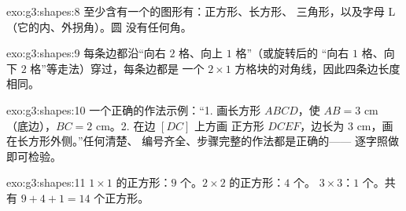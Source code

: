 \begin{solution}{exo:g3:shapes:8}
至少含有一个的图形有：正方形、长方形、
三角形，以及字母 L（它的内、外拐角）。圆
没有任何角。
\end{solution}

\begin{solution}{exo:g3:shapes:9}
每条边都沿“向右 $2$ 格、向上 $1$ 格”（或旋转后的
“向右 $1$ 格、向下 $2$ 格”等走法）穿过，每条边都是
一个 $2 \times 1$ 方格块的对角线，因此四条边长度相同。
\end{solution}

\begin{solution}{exo:g3:shapes:10}
一个正确的作法示例：“1. 画长方形 $ABCD$，使 $AB = 3$ cm
（底边），$BC = 2$ cm。2. 在边 $[DC]$ 上方画
正方形 $DCEF$，边长为 $3$ cm，画在长方形外侧。”任何清楚、
编号齐全、步骤完整的作法都是正确的——
逐字照做即可检验。
\end{solution}

\begin{solution}{exo:g3:shapes:11}
$1 \times 1$ 的正方形：$9$ 个。$2 \times 2$ 的正方形：$4$ 个。
$3 \times 3$：$1$ 个。共有 $9 + 4 + 1 = 14$ 个正方形。
\end{solution}
